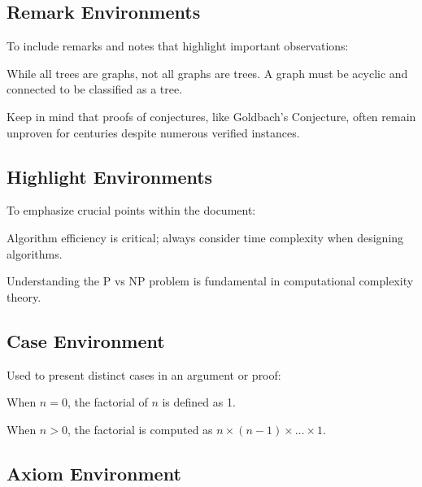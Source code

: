 \documentclass{article}
\begin{document}
\subsection{Remark Environments}

To include remarks and notes that highlight important observations:

\begin{remark}
While all trees are graphs, not all graphs are trees. A graph must be acyclic and connected to be classified as a tree.
\end{remark}

\begin{note}
Keep in mind that proofs of conjectures, like Goldbach's Conjecture, often remain unproven for centuries despite numerous verified instances.
\end{note}

\subsection{Highlight Environments}

To emphasize crucial points within the document:

\begin{important}
Algorithm efficiency is critical; always consider time complexity when designing algorithms.
\end{important}

\begin{highlight}
Understanding the P vs NP problem is fundamental in computational complexity theory.
\end{highlight}

\subsection{Case Environment}

Used to present distinct cases in an argument or proof:

\begin{case}
\item When \( n = 0 \), the factorial of \( n \) is defined as 1.
\item When \( n > 0 \), the factorial is computed as \( n \times (n-1) \times \ldots \times 1 \).
\end{case}

\subsection{Axiom Environment}
\end{document}
